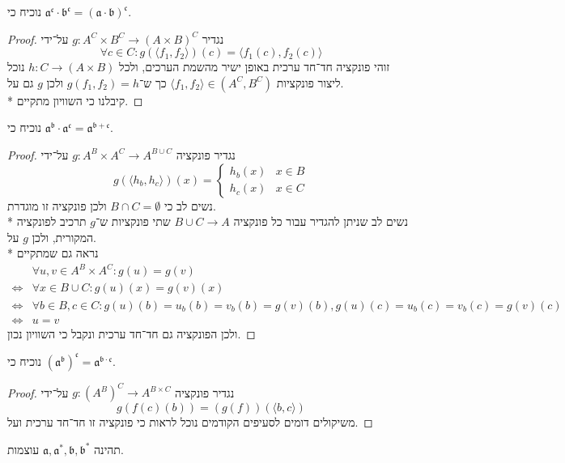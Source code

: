 \Subquestion{}
נוכיח כי $\mathfrak{a}^\mathfrak{c} \cdot \mathfrak{b}^\mathfrak{c} = {(\mathfrak{a} \cdot \mathfrak{b})}^\mathfrak{c}$.
\begin{proof}
	נגדיר $g : A^C \times B^C \to {(A \times B)}^C$ על־ידי
	\[
		\forall c \in C : g(\langle f_1, f_2 \rangle)(c) = \langle f_1(c), f_2(c) \rangle
	\]
	זוהי פונקציה חד־חד ערכית באופן ישיר מהשמת הערכים, ולכל $h : C \to (A \times B)$ נוכל ליצור פונקציות $\langle f_1, f_2 \rangle \in (A^C, B^C)$ כך ש־$g(f_1, f_2) = h$ ולכן $g$ גם על. \\*
	קיבלנו כי השוויון מתקיים.
\end{proof}

\Subquestion{}
נוכיח כי $\mathfrak{a}^\mathfrak{b} \cdot \mathfrak{a}^\mathfrak{c} = \mathfrak{a}^{\mathfrak{b} + \mathfrak{c}}$.
\begin{proof}
	נגדיר פונקציה $g : A^B \times A^C \to A^{B \cup C}$ על־ידי
	\[
		g(\langle h_b, h_c \rangle)(x) = \begin{cases}
			h_b(x) & x \in B \\
			h_c(x) & x \in C
		\end{cases}
	\]
	נשים לב כי $B \cap C = \emptyset$ ולכן פונקציה זו מוגדרת. \\*
	נשים לב שניתן להגדיר עבור כל פונקציה $B \cup C \to A$ שתי פונקציות ש־$g$ תרכיב לפונקציה המקורית, ולכן $g$ על. \\*
	נראה גם שמתקיים
	\begin{align*}
		& \forall u, v \in A^B \times A^C : g(u) = g(v) \\
		\iff & \forall x \in B \cup C : g(u)(x) = g(v)(x) \\
		\iff & \forall b \in B, c \in C : g(u)(b) = u_b(b) = v_b(b) = g(v)(b), g(u)(c) = u_b(c) = v_b(c) = g(v)(c) \\
		\iff & u = v
	\end{align*}
	ולכן הפונקציה גם חד־חד ערכית ונקבל כי השוויון נכון.
\end{proof}

\Subquestion{}
נוכיח כי ${(\mathfrak{a}^\mathfrak{b})}^\mathfrak{c} = \mathfrak{a}^{\mathfrak{b} \cdot \mathfrak{c}}$.
\begin{proof}
	נגדיר פונקציה $g : {(A^B)}^C \to A^{B \times C}$ על־ידי
	\[
		g(f(c)(b)) = (g(f))(\langle b, c \rangle)
	\]
	משיקולים דומים לסעיפים הקודמים נוכל לראות כי פונקציה זו חד־חד ערכית ועל.
\end{proof}

\Question{}
תהינה $\mathfrak{a}, \mathfrak{a}^*, \mathfrak{b}, \mathfrak{b}^*$ עוצמות.

